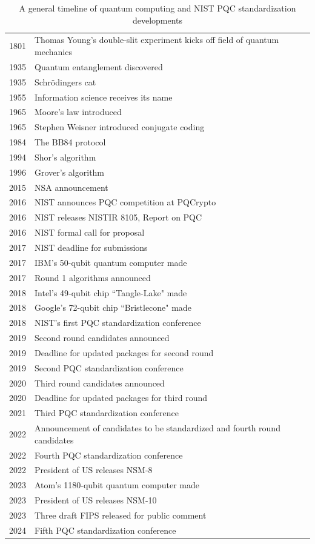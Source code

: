     \begin{table}[h!]
        \centering
        \begin{tabular}{cl}
             1801& Thomas Young's double-slit experiment kicks off field of quantum mechanics\\
     1935&Quantum entanglement discovered\\
     1935&Schr\"{o}dingers cat\\
     1955&Information science receives its name\\
     1965&Moore's law introduced\\
     1965&Stephen Weisner introduced conjugate coding\\
     1984&The BB84 protocol\\
     1994&Shor's algorithm\\
     1996&Grover's algorithm\\
     2015&NSA announcement\\
     2016&NIST announces PQC competition at PQCrypto\\
     2016&NIST releases NISTIR 8105, Report on PQC\\
     2016&NIST formal call for proposal\\
     2017&NIST deadline for submissions\\
     2017&IBM's 50-qubit quantum computer made\\
     2017&Round 1 algorithms announced\\
     2018&Intel's 49-qubit chip ``Tangle-Lake" made\\
     2018&Google's 72-qubit chip ``Bristlecone" made\\
     2018&NIST's first PQC standardization conference\\
     2019&Second round candidates announced\\
     2019&Deadline for updated packages for second round\\
     2019&Second PQC standardization conference\\
     2020&Third round candidates announced\\
     2020&Deadline for updated packages for third round\\
     2021&Third PQC standardization conference\\
     2022&Announcement of candidates to be standardized and fourth round candidates\\
     2022&Fourth PQC standardization conference\\
     2022&President of US releases NSM-8\\
     2023&Atom's 1180-qubit quantum computer made\\
     2023&President of US releases NSM-10\\
     2023&Three draft FIPS released for public comment\\
     2024&Fifth PQC standardization conference
        \end{tabular}
        \caption{A general timeline of quantum computing and NIST PQC standardization developments}
        \label{tab:qc_timeline}
    \end{table}
    
